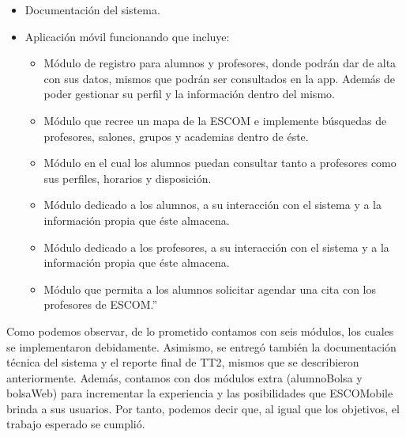 \begin{itemize}
	\item Documentación del sistema.
	\item Aplicación móvil funcionando que incluye:
	\begin{itemize}
		\item Módulo de registro para alumnos y profesores, donde podrán dar de alta con sus datos, mismos que podrán ser consultados en la app. Además de poder gestionar su perfil y la información dentro del mismo. 
		\item Módulo que recree un mapa de la ESCOM e implemente búsquedas de profesores, salones, grupos y academias dentro de éste.
		\item Módulo en el cual los alumnos puedan consultar tanto a profesores como sus perfiles, horarios y disposición. 
		\item Módulo dedicado a los alumnos, a su interacción con el sistema y a la información propia que éste almacena.
		\item Módulo dedicado a los profesores, a su interacción con el sistema y a la información propia que éste almacena.
		\item Módulo que permita a los alumnos solicitar agendar una cita con los profesores de ESCOM.'' 
	\end{itemize}
\end{itemize}
Como podemos observar, de lo prometido contamos con seis módulos, los cuales se implementaron debidamente. Asimismo, se entregó también la documentación técnica del sistema y el reporte final de TT2, mismos que se describieron anteriormente. Además, contamos con dos módulos extra (alumnoBolsa y bolsaWeb) para incrementar la experiencia y las posibilidades que ESCOMobile brinda a sus usuarios. Por tanto, podemos decir que, al igual que los objetivos, el trabajo esperado se cumplió. 
 